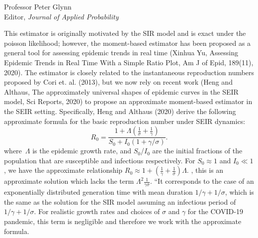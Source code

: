 \documentclass[11pt]{letter} %
\begin{document}
\begin{letter}{Professor
	Peter Glynn\\
	Editor, {\em Journal of Applied Probability}}
\begin{enumerate}
\begin{enumerate}
	This estimator is originally motivated by the SIR model and is exact under the poisson likelihood; however, the moment-based estimator has been proposed as a general tool for assessing epidemic trends in real time (Xinhua Yu, Assessing Epidemic Trends in Real Time With a Simple Ratio Plot, Am J of Epid, 189(11), 2020).  The estimator is closely related to the instantaneous reproduction numbers proposed by Cori et. al. (2013), but we now rely on recent work (Heng and Althaus, The approximately universal shapes of epidemic curves in the SEIR model, Sci Reports, 2020) to propose an approximate moment-based estimator in the SEIR setting. Specifically, Heng and Althaus (2020) derive the following approximate formula for the basic reproduction number under SEIR dynamics:
	$$
	R_0 = \frac{1 + \Lambda \left(\frac{1}{\sigma} + \frac{1}{\gamma} \right)}{S_0 + I_0 (1 + \gamma/\sigma)}.
	$$
	where~$\Lambda$ is the epidemic growth rate, and $S_0$/$I_0$ are the initial fractions of the population that are susceptible and infectious respectively.  For $S_0 \approx 1$ and $I_0 \ll 1$, we have the approximate relationship $R_0 \approx 1 + (\frac{1}{\gamma} + \frac{1}{\sigma})\Lambda$.
	, this is an approximate solution which lacks the term $\Lambda^2 \frac{1}{\gamma \sigma}$.  ``It corresponds to the case of an exponentially distributed generation time with mean duration $1/\gamma + 1/\sigma$, which is the same as the solution for the SIR model assuming an infectious period of $1/\gamma + 1/\sigma$. For realistic growth rates and choices of $\sigma$ and $\gamma$ for the COVID-19 pandemic, this term is negligible and therefore we work with the approximate formula.
	\vspace{5mm}


\end{enumerate}
\end{enumerate}
\end{letter}
\end{document}
